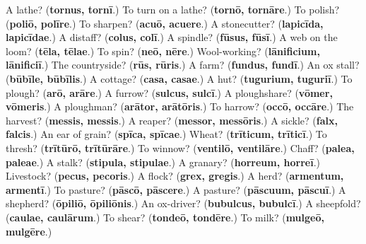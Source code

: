 \begin{tcolorbox}[breakable,colback=teal!4,colframe=teal!35!black,title={Before you move on}]
A lathe? (\textbf{tornus, tornī}.) To turn on a lathe? (\textbf{tornō, tornāre}.) To polish? (\textbf{poliō, polīre}.) To sharpen? (\textbf{acuō, acuere}.) A stonecutter? (\textbf{lapicīda, lapicīdae}.) A distaff? (\textbf{colus, colī}.) A spindle? (\textbf{fūsus, fūsī}.) A web on the loom? (\textbf{tēla, tēlae}.) To spin? (\textbf{neō, nēre}.) Wool-working? (\textbf{lānificium, lānificiī}.) The countryside? (\textbf{rūs, rūris}.) A farm? (\textbf{fundus, fundī}.) An ox stall? (\textbf{būbīle, būbīlis}.) A cottage? (\textbf{casa, casae}.) A hut? (\textbf{tugurium, tuguriī}.) To plough? (\textbf{arō, arāre}.) A furrow? (\textbf{sulcus, sulcī}.) A ploughshare? (\textbf{vōmer, vōmeris}.) A ploughman? (\textbf{arātor, arātōris}.) To harrow? (\textbf{occō, occāre}.) The harvest? (\textbf{messis, messis}.) A reaper? (\textbf{messor, messōris}.) A sickle? (\textbf{falx, falcis}.) An ear of grain? (\textbf{spīca, spīcae}.) Wheat? (\textbf{trīticum, trīticī}.) To thresh? (\textbf{trītūrō, trītūrāre}.) To winnow? (\textbf{ventilō, ventilāre}.) Chaff? (\textbf{palea, paleae}.) A stalk? (\textbf{stipula, stipulae}.) A granary? (\textbf{horreum, horreī}.) Livestock? (\textbf{pecus, pecoris}.) A flock? (\textbf{grex, gregis}.) A herd? (\textbf{armentum, armentī}.) To pasture? (\textbf{pāscō, pāscere}.) A pasture? (\textbf{pāscuum, pāscuī}.) A shepherd? (\textbf{ōpiliō, ōpiliōnis}.) An ox-driver? (\textbf{bubulcus, bubulcī}.) A sheepfold? (\textbf{caulae, caulārum}.) To shear? (\textbf{tondeō, tondēre}.) To milk? (\textbf{mulgeō, mulgēre}.)
\end{tcolorbox}
